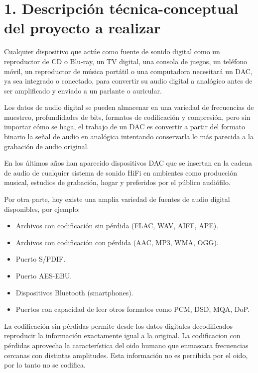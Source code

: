 \documentclass[
11pt, %
codirector, %
]{charter}
\begin{document}
\section{1. Descripción técnica-conceptual del proyecto a realizar}
\label{sec:descripcion}

Cualquier dispositivo que actúe como fuente de sonido digital como un reproductor de CD o Blu-ray, un TV digital, una consola de juegos, un teléfono móvil, un reproductor de música portátil o una computadora necesitará un DAC, ya sea integrado o conectado, para convertir su audio digital a analógico antes de ser amplificado y enviado a un parlante o auricular.

Los datos de audio digital se pueden almacenar en una variedad de frecuencias de muestreo, profundidades de bits, formatos de codificación y compresión, pero sin importar cómo se haga, el trabajo de un DAC es convertir a partir del formato binario la señal de audio en analógica intentando conservarla lo más parecida a la grabación de audio original.
 
En los últimos años han aparecido dispositivos DAC que se insertan en la cadena de audio de cualquier sistema de sonido HiFi en ambientes como producción musical, estudios de grabación, hogar y preferidos por el público audiófilo. 

Por otra parte, hoy existe una amplia variedad de fuentes de audio digital disponibles, por ejemplo:

\begin{itemize}
	\item Archivos con codificación sin pérdida (FLAC, WAV, AIFF, APE).
	\item Archivos con codificación con pérdida (AAC, MP3, WMA, OGG).
	\item Puerto S/PDIF.
	\item Puerto AES-EBU.
	\item Dispositivos Bluetooth (smartphones).
	\item Puertos con capacidad de leer otros formatos como PCM, DSD, MQA, DoP. 
\end{itemize}

La codificación sin pérdidas permite desde los datos digitales decodificados reproducir la información exactamente igual a la original.
La codificacion con pérdidas aprovecha la característica del oido humano que enmascara frecuencias cercanas con distintas amplitudes. Esta información no es percibida por el oido, por lo tanto no se codifica.    
\end{document}
